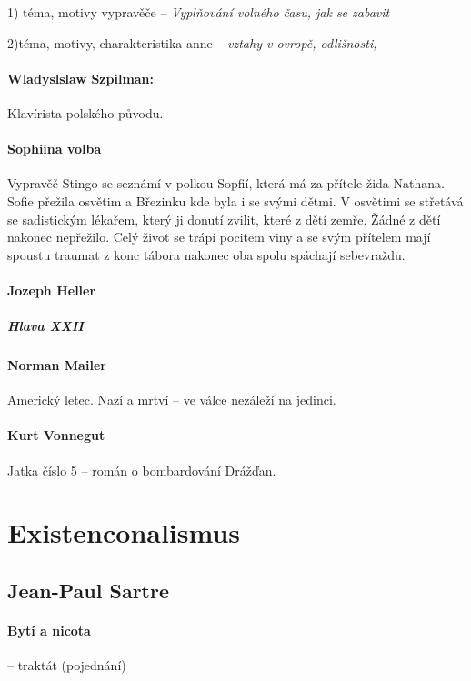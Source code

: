 \documentclass[10pt,a4page,headings,openany,%
oneside
,twocolumn
]{report}
\begin{document}
1) téma, motivy vypravěče -- \emph{Vyplňování volného času, jak se zabavit }

2)téma, motivy, charakteristika anne -- \emph{vztahy v ovropě, odlišnosti, }

\paragraph{Wladyslslaw Szpilman:} Klavírista polského původu.

\paragraph{Sophiina volba}Vypravěč Stingo se seznámí v polkou Sopfií, která má za přítele žida Nathana. Sofie přežila osvětim a Březinku kde byla i se svými dětmi. V osvětimi se střetává se sadistickým lékařem, který ji donutí zvilit, které z dětí zemře. Žádné z dětí nakonec nepřežilo. Celý život se trápí pocitem viny a se svým přítelem mají spoustu traumat z konc tábora nakonec oba spolu spáchají sebevraždu.

\paragraph{Jozeph Heller}

\subparagraph{Hlava XXII}

\paragraph{Norman Mailer} Americký letec. \textsf{Nazí a mrtví} -- ve válce nezáleží na jedinci.

\paragraph{Kurt Vonnegut} Jatka číslo 5 -- román o bombardování Drážďan.

\section{Existenconalismus}

\subsection{Jean-Paul Sartre}

\paragraph{Bytí a nicota} -- traktát (pojednání)
\vspace{12pt}
\end{document}
